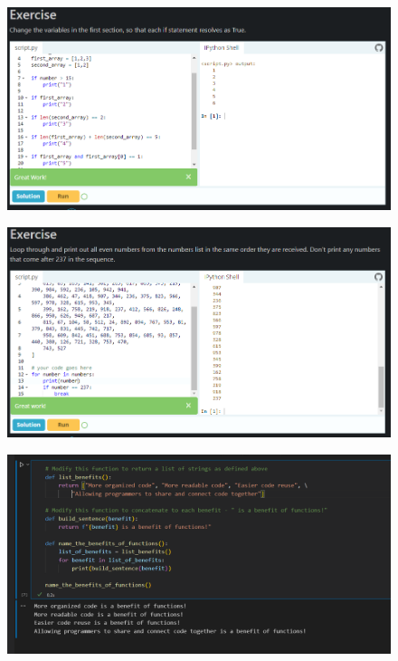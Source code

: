 \documentclass[12pt, a4paper]{article}
\begin{document}
\pagebreak
\begin{figure}[h]
\centering
\includegraphics[width=6in]{images/q7.png}
\end{figure}
\pagebreak
\begin{figure}[h]
\centering
\includegraphics[width=6in]{images/q8.png}
\end{figure}
\pagebreak
\begin{figure}[h]
\centering
\includegraphics[width=5.5in]{images/q9(part1).png}
\end{figure}
\end{document}
